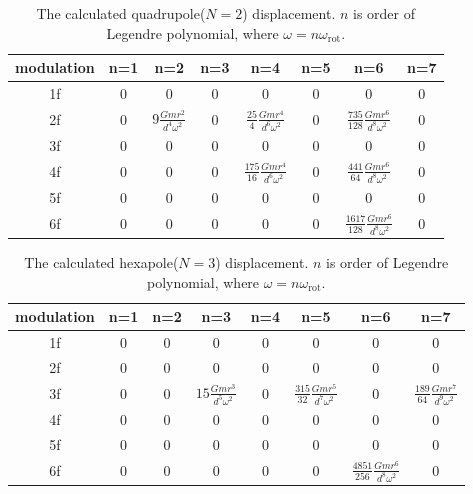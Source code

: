 \documentclass[A4]{spie}  %
\begin{document}
\begin{table}
\begin{center}
\caption{The calculated quadrupole($N=2$) displacement. $n$ is order of Legendre polynomial, where $\omega=n\omega_{\mathrm{rot}}$. \label{tab:N2}}
\footnotesize
\begin{tabular}{cccccccc}
\hline
modulation& n=1 & n=2& n=3 &n=4&n=5&n=6&n=7 \\
\hline
1f&0&0&0&0&0&0&0 \\
2f&0&$9 \frac{Gmr^2}{d^4\omega^2}$&0&$\frac{25}{4} \frac{Gmr^4}{d^6\omega^2}$&0&$\frac{735}{128} \frac{Gmr^6}{d^8\omega^2}$&0  \\
3f&0&0&0&0&0&0&0\\
4f&0&0&0&$\frac{175}{16} \frac{Gmr^4}{d^6\omega^2}$&0& $\frac{441}{64} \frac{Gmr^6}{d^8\omega^2}$&0 \\
5f&0&0&0&0&0&0&0 \\
6f&0&0&0&0&0&$\frac{1617}{128} \frac{Gmr^6}{d^8\omega^2}$&0  \\
\hline
\end{tabular}
\end{center}
\end{table}

\begin{table}
\begin{center}
\caption{The calculated hexapole($N=3$) displacement. $n$ is order of Legendre polynomial, where $\omega=n\omega_{\mathrm{rot}}$.  \label{tab:N3}}
\footnotesize
\begin{tabular}{cccccccc}
\hline
modulation& n=1 & n=2& n=3 &n=4&n=5&n=6&n=7 \\
\hline
1f&0&0&0&0&0&0&0 \\
2f&0&0&0&0&0&0&0  \\
3f&0&0&$15\frac{Gmr^3}{d^5\omega^2}$&0&$\frac{315}{32}\frac{Gmr^5}{d^7\omega^2}$&0& $\frac{189}{64} \frac{Gmr^7}{d^9 \omega^2}$\\
4f&0&0&0&0&0&0&0 \\
5f&0&0&0&0&0&0&0 \\
6f&0&0&0&0&0&$\frac{4851}{256} \frac{Gmr^6}{d^8\omega^2}$&0  \\
\hline
\end{tabular}
\end{center}
\end{table}
\end{document}

